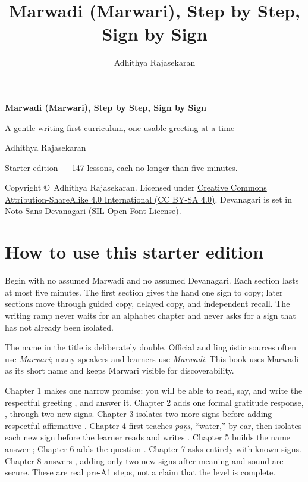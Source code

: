 \documentclass[11pt,twoside]{book}
\title{\Huge Marwadi (Marwari), Step by Step, Sign by Sign}
\author{Adhithya Rajasekaran}
\date{}
\begin{document}
\frontmatter

\begin{titlepage}
  \centering
  \vspace*{3cm}
  {\Huge\bfseries Marwadi (Marwari), Step by Step, Sign by Sign\par}
  \vspace{1cm}
  {\Large A gentle writing-first curriculum, one usable greeting at a time\par}
  \vspace{1.5cm}
  {\large Adhithya Rajasekaran\par}
  \vfill
  {\large Starter edition --- 147 lessons, each no longer than five minutes.\par}
  \vspace{2cm}
  {\normalsize Copyright \copyright\ Adhithya Rajasekaran. Licensed under
    \href{https://creativecommons.org/licenses/by-sa/4.0/}%
    {Creative Commons Attribution-ShareAlike 4.0 International (CC BY-SA 4.0)}.
    Devanagari is set in Noto Sans Devanagari (SIL Open Font License).\par}
\end{titlepage}

\chapter*{How to use this starter edition}

Begin with no assumed Marwadi and no assumed Devanagari. Each section lasts at
most five minutes. The first section gives the hand one sign to copy; later
sections move through guided copy, delayed copy, and independent recall. The
writing ramp never waits for an alphabet chapter and never asks for a sign that
has not already been isolated.

The name in the title is deliberately double. Official and linguistic sources
often use \emph{Marwari}; many speakers and learners use \emph{Marwadi}. This
book uses Marwadi as its short name and keeps Marwari visible for discoverability.

Chapter 1 makes one narrow promise: you will be able to read, say, and write the
respectful greeting , and answer it. Chapter 2 adds one formal
gratitude response, , through two new signs. Chapter 3 isolates two
more signs before adding respectful affirmative . Chapter 4 first
teaches \emph{pāṇī}, ``water,'' by ear, then isolates each new sign before the
learner reads and writes . Chapter 5 builds the name answer
; Chapter 6 adds the question
. Chapter 7 asks  entirely with known
signs. Chapter 8 answers , adding only two new signs after
meaning and sound are secure.
These are real pre-A1 steps, not a claim that the level is complete.

\tableofcontents
\mainmatter

\end{document}
